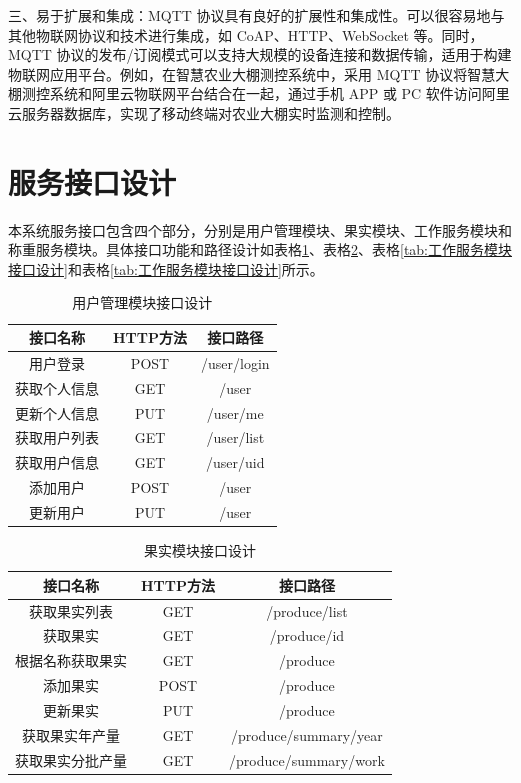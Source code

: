 三、易于扩展和集成：MQTT 协议具有良好的扩展性和集成性。可以很容易地与其他物联网协议和技术进行集成，如 CoAP、HTTP、WebSocket 等。同时，MQTT 协议的发布/订阅模式可以支持大规模的设备连接和数据传输，适用于构建物联网应用平台。例如，在智慧农业大棚测控系统中，采用 MQTT 协议将智慧大棚测控系统和阿里云物联网平台结合在一起，通过手机 APP 或 PC 软件访问阿里云服务器数据库，实现了移动终端对农业大棚实时监测和控制\cite{Liang2020}。

\section{服务接口设计}

本系统服务接口包含四个部分，分别是用户管理模块、果实模块、工作服务模块和称重服务模块。具体接口功能和路径设计如表格\ref{tab:用户管理模块接口设计}、表格\ref{tab:果实模块接口设计}、表格\ref{tab:工作服务模块接口设计}和表格\ref{tab:工作服务模块接口设计}所示。

\begin{table}[H]
\centering
\begin{tabular}{|c|c|c|}
\hline
\textbf{接口名称} & \textbf{HTTP方法} & \textbf{接口路径} \\
\hline
用户登录 & POST & /user/login \\
\hline
获取个人信息 & GET & /user \\
\hline
更新个人信息 & PUT & /user/me \\
\hline
获取用户列表 & GET & /user/list \\
\hline
获取用户信息 & GET & /user/{uid} \\
\hline
添加用户 & POST & /user \\
\hline
更新用户 & PUT & /user \\
\hline
\end{tabular}%

\caption{用户管理模块接口设计}
\label{tab:用户管理模块接口设计}
\end{table}

\begin{table}[H]
\centering
\begin{tabular}{|c|c|c|}
\hline
\textbf{接口名称} & \textbf{HTTP方法} & \textbf{接口路径} \\
\hline
获取果实列表 & GET & /produce/list \\
\hline
获取果实 & GET & /produce/{id} \\
\hline
根据名称获取果实 & GET & /produce \\
\hline
添加果实 & POST & /produce \\
\hline
更新果实 & PUT & /produce \\
\hline
获取果实年产量 & GET & /produce/summary/year \\
\hline
获取果实分批产量 & GET & /produce/summary/work \\
\hline
\end{tabular}%

\caption{果实模块接口设计}
\label{tab:果实模块接口设计}
\end{table}

